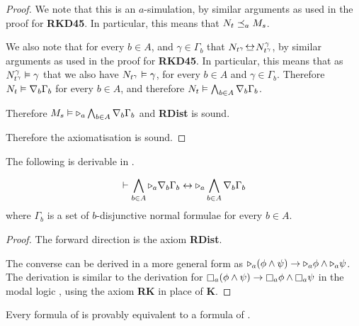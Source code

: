 \begin{proof}
We note that this is an $a$-simulation, by similar arguments as used in the
proof for {\bf RKD45}. In particular, this means that $N_t \preceq_a M_s$.

We also note that for every $b \in A$, and $\gamma \in \Gamma_b$ that
$N_{t^\gamma} \bisim N^\gamma_{t^\gamma}$, by similar arguments as used in the
proof for {\bf RKD45}. In particular, this means that as $N^\gamma_{t^\gamma}
\vDash \gamma$ that we also have $N_{t^\gamma} \vDash \gamma$, for every $b
\in A$ and $\gamma \in \Gamma_b$. Therefore $N_t \vDash \nabla_b \Gamma_b$
for every $b \in A$, and therefore $N_t \vDash \bigwedge_{b \in A} \nabla_b
\Gamma_b$.

Therefore $M_s \vDash {\ensuremath{\mathopen{\triangleright}}}_a \bigwedge_{b \in A} \nabla_b \Gamma_b$ and
{\bf RDist} is sound.

Therefore the axiomatisation \axiomKDF{} is sound.
\end{proof}

\begin{lemma}
The following is derivable in \axiomKDF{}.

$$
\vdash \bigwedge_{b \in A} {\mathopen{\triangleright}}_a \nabla_b \Gamma_b \leftrightarrow
{\ensuremath{\mathopen{\triangleright}}}_a \bigwedge_{b \in A} \nabla_b \Gamma_b \\
$$
where $\Gamma_b$ is a set of $b$-disjunctive normal formulae for
every $b \in A$.
\end{lemma}

\begin{proof}
The forward direction is the axiom {\bf RDist}. 

The converse can be derived in a more general form as ${\mathopen{\triangleright}}_a (\phi \land
\psi) \rightarrow {\ensuremath{\mathopen{\triangleright}}}_a \phi \land {\ensuremath{\mathopen{\triangleright}}}_a \psi$. The derivation is
similar to the derivation for $\knows_a (\phi \land \psi) \implies \knows_a \phi
\land \knows_a \psi$ in the modal logic \logicK{}, using the axiom {\bf RK} in
place of {\bf K}.
\end{proof}

\begin{lemma}\label{kd45-translation}
Every formula of \logicKDF{} is provably equivalent to a formula of \logicKD{}.
\end{lemma}

